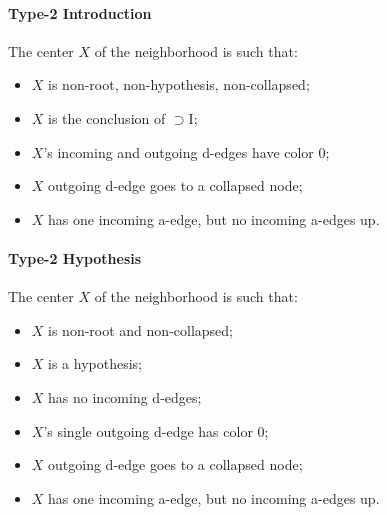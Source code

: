 \documentclass[12pt]{article}
\begin{document}
\paragraph{Type-2 Introduction}
The center $X$ of the neighborhood is such that:
\begin{itemize}
\item $X$ is non-root, non-hypothesis, non-collapsed;
\item $X$ is the conclusion of $⊃$I;
\item $X$'s incoming and outgoing d-edges have color 0;
\item $X$ outgoing d-edge goes to a collapsed node;
\item $X$ has one incoming a-edge, but no incoming a-edges up.
\end{itemize}

\paragraph{Type-2 Hypothesis}
The center $X$ of the neighborhood is such that:
\begin{itemize}
\item $X$ is non-root and non-collapsed;
\item $X$ is a hypothesis;
\item $X$ has no incoming d-edges;
\item $X$'s single outgoing d-edge has color 0;
\item $X$ outgoing d-edge goes to a collapsed node;
\item $X$ has one incoming a-edge, but no incoming a-edges up.
\end{itemize}
\end{document}
